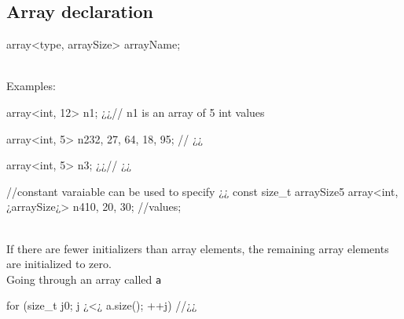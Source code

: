 \subsection{Array declaration}
\begin{minipage}{\MPWxLARGExLISTING\textwidth} %
{} %
\begin{CPPCode}
array<type, arraySize> arrayName;
\end{CPPCode}
\end{minipage}
\\
Examples:\\
\begin{minipage}{\MPWxLARGExLISTING\textwidth} %
{} %
\begin{CPPCode}
array<int, 12> n1; ¿\hspace{3.2cm}¿// n1 is an array of 5 int values

array<int, 5> n2{32, 27, 64, 18, 95}; // ¿¿

array<int, 5> n3{}; ¿\hspace{3.0cm}¿// ¿¿

//constant varaiable can be used to specify ¿¿
const size_t arraySize{5} 
array<int, ¿arraySize¿> n4{10, 20, 30}; //values; 
\end{CPPCode}
\end{minipage}
\\
If there are fewer initializers than array elements, the remaining array elements are initialized
to zero.\\

\noindent Going through an array called \texttt{a}\\
\begin{minipage}{\MPWxLARGExLISTING\textwidth} %
{} %
\begin{CPPCode}
for (size_t j{0}; j ¿<¿ a.size(); ++j)
{
    //¿¿
}
\end{CPPCode}
\end{minipage}

